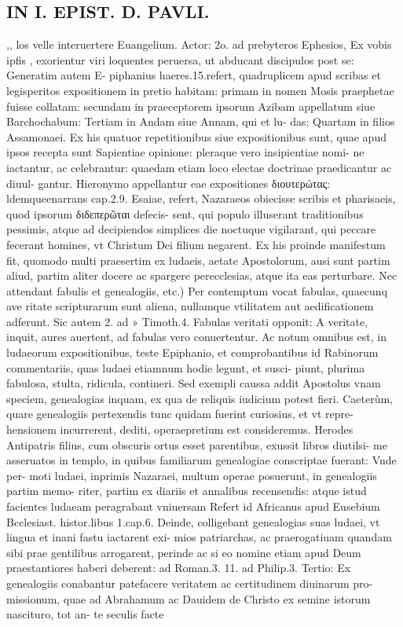 \documentclass{article}
\begin{document}
\begin{pages}
\section*{IN I. EPIST. D. PAVLI. }
\marginpar{[ p.8 ]}
\marginpar{[ p.9 ]}
\marginpar{[ p.10 ]}
\marginpar{[ p.11 ]}
\marginpar{[ p.12 ]}
\marginpar{[ p.13 ]}\pstart ,, los velle interuertere Euangelium. Actor: 2o. ad prebyteros Ephesios, Ex vobis ipfis , exorientur viri loquentes peruersa, ut abducant discipulos post se: Generatim autem E- piphanius haeres.15.refert, quadruplicem apud scribas et legisperitos expositionem in pretio habitam: primam in nomen Mosis praephetae fuisse collatam: secundam in praeceptorem ipsorum Azibam appellatum siue Barchochabum: Tertiam in Andam siue Annam, qui et lu- das: Quartam in filios Assamonaei. Ex his quatuor repetitionibus siue expositionibus sunt, quae apud ipsos recepta sunt Sapientiae opinione: pleraque  vero insipientiae nomi- ne iactantur, ac celebrantur: quaedam etiam loco electae doctrinae praedicantur ac diuul- gantur. Hieronymo appellantur eae expositiones διουτερώτας: ldemqueenarrans cap.2.9. Esaiae, refert, Nazaraeos obiecisse scribis et pharisaeis, quod ipsorum διδεπερῶται defecis- sent, qui populo illuserant traditionibus pessimis, atque  ad decipiendos simplices die noctuque  vigilarant, qui peccare fecerant homines, vt Christum Dei filium negarent. Ex his proinde manifestum fit, quomodo multi praesertim ex ludaeis, aetate Apostolorum, ausi sunt partim aliud, partim aliter docere ac spargere perecclesias, atque  ita eas perturbare.  \pend\pstart Nec attendant fabulis et genealogiis, etc.) Per contemptum vocat fabulas, quaecunq ave ritate scripturarum sunt aliena, nullamque  vtilitatem aut aedificationem adferunt. Sic autem 2. ad » Timoth.4. Fabulas veritati opponit: A veritate, inquit, aures auertent, ad fabulas vero conuertentur. Ac notum omnibus est, in ludaeorum expositionibus, teste Epiphanio, et comprobantibus id Rabinorum commentariis, quas ludaei etiamnum hodie legunt, et susci- piunt, plurima fabulosa, stulta, ridicula, contineri. Sed exempli caussa addit Apostolus vnam speciem, genealogias inquam, ex qua de reliquis iudicium potest fieri.  \pend\pstart Caeterùm, quare genealogiis pertexendis tunc quidam fuerint curiosius, et vt repre- hensionem incurrerent, dediti, operaepretium est consideremus.  \pend\pstart Herodes Antipatris filius, cum obscuris ortus esset parentibus, exussit libros diutilsi- me asseruatos in templo, in quibus familiarum genealogiae conscriptae fuerant: Vnde per- moti ludaei, inprimis Nazaraei, multum operae posuerunt, in genealogiis partim memo- riter, partim ex diariis et annalibus recensendis: atque  istud facientes ludaeam peragrabant vniuersam Refert id Africanus apud Eusebium Bcclesiast. histor.libus 1.cap.6.  \pend\pstart Deinde, colligebant genealogias suas ludaei, vt lingua et inani fastu iactarent exi- mios patriarchas, ac praerogatiuam quandam sibi prae gentilibus arrogarent, perinde ac si eo nomine etiam apud Deum praestantiores haberi deberent: ad Roman.3. 11. ad Philip.3. Tertio: Ex genealogiis conabantur patefacere veritatem ac certitudinem diuinarum pro- missionum, quae ad Abrahamum ac Dauidem de Christo ex semine istorum nascituro, tot an- te seculis facte 
\end{pages}
\end{document}
